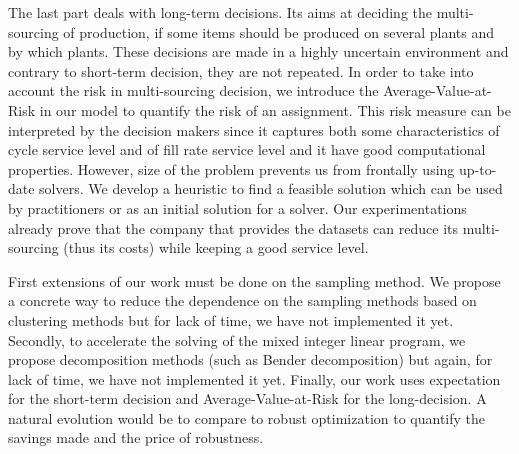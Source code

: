 The last part deals with long-term decisions.
Its aims at deciding the multi-sourcing of production, \ie if some items should be produced on several plants and by which plants.
These decisions are made in a highly uncertain environment and contrary to short-term decision, they are not repeated.
In order to take into account the risk in multi-sourcing decision, we introduce the Average-Value-at-Risk in our model to quantify the risk of an assignment.
This risk measure can be interpreted by the decision makers since it captures both some characteristics of cycle service level and of fill rate service level and it have good computational properties.
However, size of the problem prevents us from frontally using up-to-date solvers.
We develop a heuristic to find a feasible solution which can be used by practitioners or as an initial solution for a solver.
Our experimentations already prove that the company that provides the datasets can reduce its multi-sourcing (thus its costs) while keeping a good service level.


First extensions of our work must be done on the sampling method.
We propose a concrete way to reduce the dependence on the sampling methods based on clustering methods but for lack of time, we have not implemented it yet.
Secondly, to accelerate the solving of the mixed integer linear program, we propose decomposition methods (such as Bender decomposition) but again, for lack of time, we have not implemented it yet.
Finally, our work uses expectation for the short-term decision and Average-Value-at-Risk for the long-decision.
A natural evolution would be to compare to robust optimization to quantify the savings made and the price of robustness.

